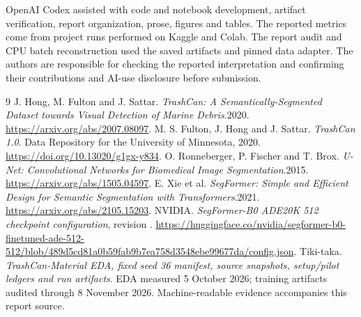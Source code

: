OpenAI Codex assisted with code and notebook development, artifact verification, report organization, prose, figures and tables. The reported metrics come from project runs performed on Kaggle and Colab. The report audit and CPU batch reconstruction used the saved artifacts and pinned data adapter. The authors are responsible for checking the reported interpretation and confirming their contributions and AI-use disclosure before submission.

\begin{thebibliography}{9}
 J. Hong, M. Fulton and J. Sattar. \emph{TrashCan: A Semantically-Segmented Dataset towards Visual Detection of Marine Debris}.2020. \url{https://arxiv.org/abs/2007.08097}.
 M. S. Fulton, J. Hong and J. Sattar. \emph{TrashCan 1.0}. Data Repository for the University of Minnesota, 2020. \url{https://doi.org/10.13020/g1gx-y834}.
 O. Ronneberger, P. Fischer and T. Brox. \emph{U-Net: Convolutional Networks for Biomedical Image Segmentation}.2015. \url{https://arxiv.org/abs/1505.04597}.
 E. Xie et al. \emph{SegFormer: Simple and Efficient Design for Semantic Segmentation with Transformers}.2021. \url{https://arxiv.org/abs/2105.15203}.
 NVIDIA. \emph{SegFormer-B0 ADE20K 512 checkpoint configuration}, revision . \url{https://huggingface.co/nvidia/segformer-b0-finetuned-ade-512-512/blob/489d5cd81a0b59fab9b7ea758d3548ebe99677da/config.json}.
 Tiki-taka. \emph{TrashCan-Material EDA, fixed seed 36 manifest, source snapshots, setup/pilot ledgers and run artifacts}. EDA measured 5 October 2026; training artifacts audited through 8 November 2026. Machine-readable evidence accompanies this report source.
\end{thebibliography}
